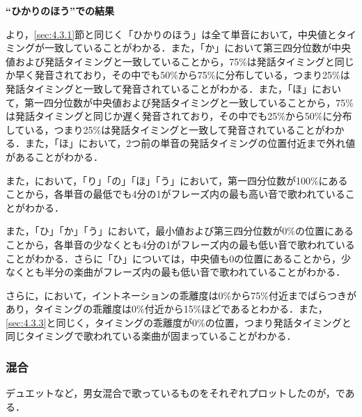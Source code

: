 \textbf{“ひかりのほう”での結果}\par
より，\ref{sec:4.3.1}節と同じく「ひかりのほう」は全て単音において，中央値とタイミングが一致していることがわかる．また，「か」において第三四分位数が中央値および発話タイミングと一致していることから，75\%は発話タイミングと同じか早く発音されており，その中でも50\%から75\%に分布している，つまり25\%は発話タイミングと一致して発音されていることがわかる．また，「ほ」において，第一四分位数が中央値および発話タイミングと一致していることから，75\%は発話タイミングと同じか遅く発音されており，その中でも25\%から50\%に分布している，つまり25\%は発話タイミングと一致して発音されていることがわかる．また，「ほ」において，2つ前の単音の発話タイミングの位置付近まで外れ値があることがわかる．\par
また，において，「り」「の」「ほ」「う」において，第一四分位数が100\%にあることから，各単音の最低でも4分の1がフレーズ内の最も高い音で歌われていることがわかる．\par
また，「ひ」「か」「う」において，最小値および第三四分位数が0\%の位置にあることから，各単音の少なくとも4分の1がフレーズ内の最も低い音で歌われていることがわかる．さらに「ひ」については，中央値も0の位置にあることから，少なくとも半分の楽曲がフレーズ内の最も低い音で歌われていることがわかる．\par
さらに，において，イントネーションの乖離度は0\%から75\%付近までばらつきがあり，タイミングの乖離度は0\%付近から15\%ほどであるとわかる．また，\ref{sec:4.3.3}と同じく，タイミングの乖離度が0\%の位置，つまり発話タイミングと同じタイミングで歌われている楽曲が固まっていることがわかる．

\subsubsection{混合}
デュエットなど，男女混合で歌っているものをそれぞれプロットしたのが，である．\par

